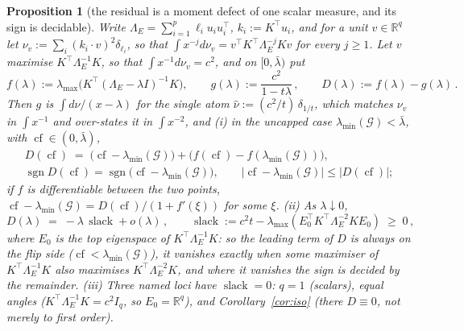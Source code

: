 \documentclass[11pt]{article}
\newtheorem{proposition}[theorem]{Proposition}
\theoremstyle{remark}
\newcommand{\Gr}{\mathcal{G}}
\newcommand{\Le}{\Lambda_E}
\begin{document}
\begin{proposition}[the residual is a moment defect of one scalar measure, and its sign is decidable]
\label{prop:side}
Write $\Le=\sum_{i=1}^{p}\ell_i u_iu_i^{\top}$, $k_i:=K^{\top}u_i$, and for a unit $v\in\mathbb R^{q}$
let $\nu_v:=\sum_i(k_i\cdot v)^2\delta_{\ell_i}$, so that
$\int x^{-j}d\nu_v=v^{\top}K^{\top}\Le^{-j}Kv$ for every $j\ge1$. Let $v$ maximise
$K^{\top}\Le^{-1}K$, so that $\int x^{-1}d\nu_v=c^{2}$, and on $[0,\bar\lambda)$ put
\[
  f(\lambda):=\lambda_{\max}\!\bigl(K^{\top}(\Le-\lambda I)^{-1}K\bigr),\qquad
  g(\lambda):=\frac{c^{2}}{1-t\lambda}\,,\qquad
  D(\lambda):=f(\lambda)-g(\lambda)\,.
\]
Then $g$ is $\int d\nu/(x-\lambda)$ for the single atom $\hat\nu:=(c^{2}/t)\,\delta_{1/t}$, which
matches $\nu_v$ in $\int x^{-1}$ and over-states it in $\int x^{-2}$, and
\emph{(i)} in the uncapped case $\lambda_{\min}(\Gr)<\bar\lambda$, with
$\operatorname{cf}\in(0,\bar\lambda)$,
\begin{equation}\label{eq:side}
  \begin{gathered}
  D(\operatorname{cf})\;=\;\bigl(\operatorname{cf}-\lambda_{\min}(\Gr)\bigr)
  +\bigl(f(\operatorname{cf})-f(\lambda_{\min}(\Gr))\bigr),\\[2pt]
  \operatorname{sgn}D(\operatorname{cf})=\operatorname{sgn}\bigl(\operatorname{cf}-\lambda_{\min}(\Gr)\bigr),
  \qquad
  \bigl|\operatorname{cf}-\lambda_{\min}(\Gr)\bigr|\le\bigl|D(\operatorname{cf})\bigr|;
  \end{gathered}
\end{equation}
if $f$ is differentiable between the two points, $\operatorname{cf}-\lambda_{\min}(\Gr)=
D(\operatorname{cf})/(1+f'(\xi))$ for some $\xi$. \emph{(ii)} As $\lambda\downarrow0$,
\begin{equation}\label{eq:slack}
  D(\lambda)\;=\;-\lambda\,\operatorname{slack}+o(\lambda)\,,\qquad
  \operatorname{slack}:=c^{2}t-\lambda_{\max}(E_0^{\top}K^{\top}\Le^{-2}KE_0)\;\ge\;0\,,
\end{equation}
where $E_0$ is the top eigenspace of $K^{\top}\Le^{-1}K$: so the leading term of $D$ is always on the
\emph{flip} side ($\operatorname{cf}<\lambda_{\min}(\Gr)$), it vanishes exactly when some maximiser
of $K^{\top}\Le^{-1}K$ also maximises $K^{\top}\Le^{-2}K$, and where it vanishes the sign is decided
by the remainder. \emph{(iii)} Three named loci have $\operatorname{slack}=0$: $q=1$ (scalars),
equal angles ($K^{\top}\Le^{-1}K=c^{2}I_q$, so $E_0=\mathbb R^{q}$), and
Corollary~\ref{cor:iso} (there $D\equiv0$, not merely to first order).
\end{proposition}
\end{document}
